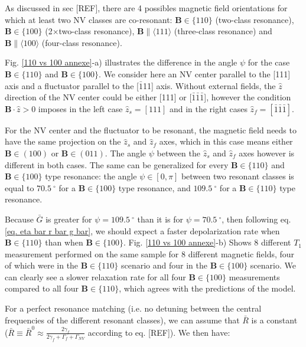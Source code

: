 \documentclass[a4paper, 11pt]{book}
\begin{document}
As discussed in sec [REF], there are 4 possibles magnetic field orientations for which at least two NV classes are co-resonant: $\mathbf{B} \in \{110\}$ (two-class resonance), $\mathbf{B} \in \{100\}$ (2$\times$two-class resonance), $\mathbf{B} \parallel \langle 111 \rangle$ (three-class resonance) and $\mathbf{B} \parallel \langle 100\rangle$ (four-class resonance).

Fig. \ref{110 vs 100 annexe}-a) illustrates the difference in the angle $\psi$ for the case $\mathbf{B} \in \{110\}$ and $\mathbf{B} \in \{100\}$. We consider here an NV center parallel to the [111] axis and a fluctuator parallel to the [$\bar 1$11] axis. Without external fields, the $\hat z$ direction of the NV center could be either [111] or [$\bar 1 \bar 1 \bar 1$], however the condition $\mathbf{B}\cdot\hat{z} >0$ imposes in the left case $\hat z_s=[111]$ and in the right cases $\hat z_f=[\bar 1 \bar 1 \bar 1]$. 

For the NV center and the fluctuator to be resonant, the magnetic field needs to have the same projection on the $\hat z_s$ and $\hat z_f$ axes, which in this case means either $\mathbf{B} \in (100)$ or $\mathbf{B} \in (011)$. The angle $\psi$ between the $\hat z_s$ and $\hat z_f$ axes however is different in both cases. The same can be generalized for every $\mathbf{B} \in \{110\}$ and $\mathbf{B} \in \{100\}$ type resonance: the angle $\psi \in [0,\pi]$ between two resonant classes is equal to $70.5 \ ^\circ$ for a $\mathbf{B} \in \{100\}$ type resonance, and $109.5 \ ^\circ$ for a $\mathbf{B} \in \{110\}$ type resonance.

Because $\bar G$ is greater for $\psi=109.5 \ ^\circ$ than it is for $\psi=70.5 \ ^\circ$, then following eq. \ref{eq. eta bar r bar g bar}, we should expect a faster depolarization rate when $\mathbf{B} \in \{110\}$ than when $\mathbf{B} \in \{100\}$. Fig. \ref{110 vs 100 annexe}-b) Shows 8 different $T_1$ measurement performed on the same sample for 8 different magnetic fields, four of which were in the $\mathbf{B} \in \{110\}$ scenario and four in the $\mathbf{B} \in \{100\}$ scenario. We can clearly see a slower relaxation rate for all four $\mathbf{B} \in \{100\}$ measurements compared to all four $\mathbf{B} \in \{110\}$, which agrees with the predictions of the model.

For a perfect resonance matching (i.e. no detuning between the central frequencies of the different resonant classes), we can assume that $\bar R$ is a constant ($\bar R \equiv \bar R^0 \approx \frac{2 \gamma_f}{2 \gamma_f + \Gamma_f + \Gamma_{NV}}$ according to eq. [REF]). We then have:
\end{document}

